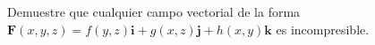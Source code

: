 \item Demuestre que cualquier campo vectorial de la forma $\mathbf{F}(x,y,z) = f(y,z)\mathbf{i} + g(x,z)\mathbf{j} + h(x,y)\mathbf{k}$ es incompresible.
